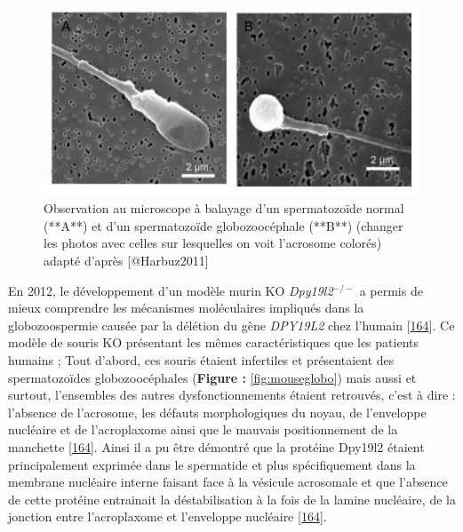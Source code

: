 \documentclass[12pt,twoside]{reedthesis}
\theoremstyle{definition}
\theoremstyle{definition}
\theoremstyle{remark}
\begin{document}
  \begin{figure}
  
  {\centering \includegraphics[scale=0.50]{figure/globo_normal_spz} 
  
  }
  
  \caption[Observation au microscope à balayage d'un spermatozoïde normal (**A**) et d'un spermatozoïde globozoocéphale (**B**) (changer les photos avec celles sur lesquelles on voit l'acrosome colorés)]{Observation au microscope à balayage d'un spermatozoïde normal (**A**) et d'un spermatozoïde globozoocéphale (**B**) (changer les photos avec celles sur lesquelles on voit l'acrosome colorés) adapté d'après [@Harbuz2011]}\label{fig:globospz}
  \end{figure}
  
  En 2012, le développement d'un modèle murin KO \emph{Dpy19l2}\(^{-/-}\)
  a permis de mieux comprendre les mécanismes moléculaires impliqués dans
  la globozoospermie causée par la délétion du gène \emph{DPY19L2} chez
  l'humain {[}\protect\hyperlink{ref-Pierre2012}{164}{]}. Ce modèle de
  souris KO présentant les mêmes caractéristiques que les patients humains
  ; Tout d'abord, ces souris étaient infertiles et présentaient des
  spermatozoïdes globozoocéphales (\textbf{Figure : }\ref{fig:mouseglobo})
  mais aussi et surtout, l'ensembles des autres dysfonctionnements étaient
  retrouvés, c'est à dire : l'absence de l'acrosome, les défauts
  morphologiques du noyau, de l'enveloppe nucléaire et de l'acroplaxome
  ainsi que le mauvais positionnement de la manchette
  {[}\protect\hyperlink{ref-Pierre2012}{164}{]}. Ainsi il a pu être
  démontré que la protéine Dpy19l2 étaient principalement exprimée dans le
  spermatide et plus spécifiquement dans la membrane nucléaire interne
  faisant face à la vésicule acrosomale et que l'absence de cette protéine
  entrainait la déstabilisation à la fois de la lamine nucléaire, de la
  jonction entre l'acroplaxome et l'enveloppe nucléaire
  {[}\protect\hyperlink{ref-Pierre2012}{164}{]}.
  
\end{document}
